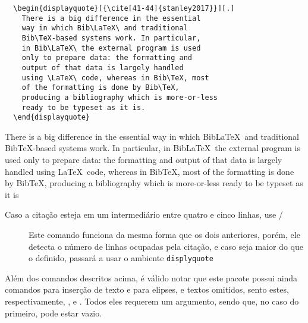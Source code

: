 \begin{center}
  \begin{minipage}{.4\linewidth}
\begin{verbatim}
  \begin{displayquote}[{\cite[41-44]{stanley2017}}][.]
    There is a big difference in the essential 
    way in which Bib\LaTeX\ and traditional 
    Bib\TeX-based systems work. In particular,
    in Bib\LaTeX\ the external program is used 
    only to prepare data: the formatting and 
    output of that data is largely handled 
    using \LaTeX\ code, whereas in Bib\TeX, most 
    of the formatting is done by Bib\TeX, 
    producing a bibliography which is more-or-less 
    ready to be typeset as it is.
  \end{displayquote}
\end{verbatim}
\end{minipage}
\hfill
\begin{minipage}{.4\linewidth}
  \begin{displayquote}
    There is a big difference in the essential 
    way in which Bib\LaTeX\ and traditional 
    Bib\TeX-based systems work. In particular,
    in Bib\LaTeX\ the external program is used 
    only to prepare data: the formatting and 
    output of that data is largely handled 
    using \LaTeX\ code, whereas in Bib\TeX, most 
    of the formatting is done by Bib\TeX, 
    producing a bibliography which is more-or-less 
    ready to be typeset as it is
  \end{displayquote}
\end{minipage}
\end{center}
\begin{description}
  \item [Caso a citação esteja em um intermediário entre quatro e cinco linhas, 
        use \latexinline/\blockquote/] Este comando funciona da mesma forma
        que os dois anteriores, porém, ele detecta o número de linhas ocupadas
        pela citação, e caso seja maior do que o definido, passará a usar o ambiente
        \texttt{displyquote}
\end{description}


Além dos comandos descritos acima, é válido notar que este pacote possui ainda
comandos para inserção de texto e para elipses, e textos omitidos, sento estes,
respectivamente, \latexinline{\textins}, \latexinline{\textelp} e \latexinline{\textdel}.
Todos eles requerem um argumento, sendo que, no caso do primeiro, pode estar vazio.

